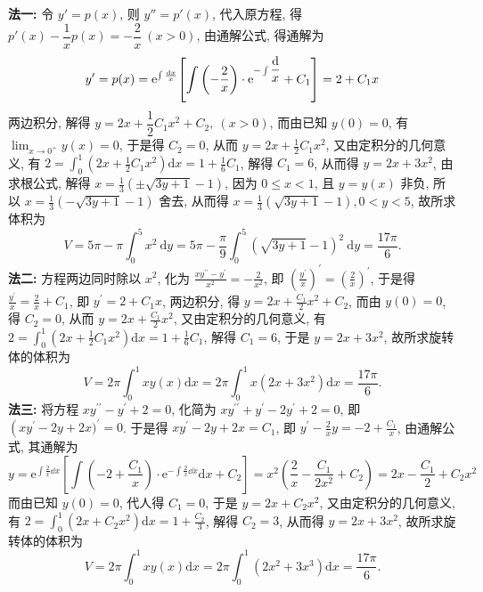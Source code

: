 \begin{solution}
    \textbf{法一: }令 $y'=p(x)$, 则 $y''=p'(x)$, 代入原方程, 得 $p'(x)-\dfrac{1}{x}p(x)=-\dfrac{2}{x}~(x>0)$, 由通解公式, 得通解为 
    $$y'=p(x)=\mathrm{e} ^{\int\frac{\dd x}{x}}\qty[\int\qty(-\dfrac{2}{x})\cdot\mathrm{e} ^{-\int\dfrac{\dd }{x}}+C_1]=2+C_1x$$
    两边积分, 解得 $y=2x+\dfrac{1}{2}C_1x^2+C_2,~(x>0)$, 而由已知 $ y(0)=0 $, 有 $\displaystyle  \lim _{x \rightarrow 0^{+}} y(x)=0 $, 于是得 $ C_{2}=0 $, 从而 $\displaystyle  y=2 x+\frac{1}{2} C_{1} x^{2} $, 又由定积分的几何意义, 有 $\displaystyle  2=\int_{0}^{1}\left(2 x+\frac{1}{2} C_{1} x^{2}\right) \mathrm{d} x=1+\frac{1}{6} C_{1} $, 解得 $ C_{1}=6 $, 从而得 $ y=2 x+3 x^{2} $, 由求根公式, 解得 $\displaystyle  x=\frac{1}{3}( \pm \sqrt{3 y+1}-1) $, 因为 $ 0 \leqslant x<1 $, 且 $ y=y(x) $ 非负, 所以 $\displaystyle  x=\frac{1}{3}(-\sqrt{3 y+1}-1) $ 舍去, 从而得 $\displaystyle  x=\frac{1}{3}(\sqrt{3 y+1}-1), 0<y<5 $, 故所求体积为 $$ V=5 \pi-\pi \int_{0}^{5} x^{2} \mathrm{~d} y=5 \pi-\frac{\pi}{9} \int_{0}^{5}(\sqrt{3 y+1}-1)^{2} \mathrm{~d} y=\frac{17 \pi}{6} .$$
    \textbf{法二: }方程两边同时除以 $ x^{2} $, 化为 $\displaystyle  \frac{x y^{\prime \prime}-y^{\prime}}{x^{2}}=-\frac{2}{x^{2}} $, 即 $\displaystyle  \left(\frac{y^{\prime}}{x}\right)^{\prime}=\left(\frac{2}{x}\right)^{\prime} $, 于是得 $\displaystyle  \frac{y^{\prime}}{x}=\frac{2}{x}+C_{1} $, 即 $ y^{\prime}=2+C_{1} x $, 两边积分, 得 $\displaystyle  y=2 x+\frac{C_{1}}{2} x^{2}+C_{2} $, 而由 $ y(0)=0 $, 得 $ C_{2}=0 $, 从而 $\displaystyle  y=2 x+\frac{C_{1}}{2} x^{2} $, 又由定积分的几何意义, 有 $\displaystyle  2=\int_{0}^{1}\left(2 x+\frac{1}{2} C_{1} x^{2}\right) \mathrm{d} x=1+\frac{1}{6} C_{1} $, 解得 $ C_{1}=6 $, 于是 $ y=2 x+3 x^{2} $, 故所求旋转体的体积为
    $$
    V=2 \pi \int_{0}^{1} x y(x) \mathrm{d} x=2 \pi \int_{0}^{1} x\left(2 x+3 x^{2}\right) \mathrm{d} x=\frac{17 \pi}{6} .
    $$
    \textbf{法三: }将方程 $ x y^{\prime \prime}-y^{\prime}+2=0 $, 化简为 $ x y^{\prime \prime}+y^{\prime}-2 y^{\prime}+2=0 $, 即 $ \left(x y^{\prime}-\right.   2 y+2 x)^{\prime}=0 $. 于是得 $ x y^{\prime}-2 y+2 x=C_{1} $, 即 $\displaystyle  y^{\prime}-\frac{2}{x} y=-2+\frac{C_{1}}{x} $, 由通解公式, 其通解为
    $$y=\mathrm{e}^{\int \frac{2}{x} \dd  x}\left[\int\left(-2+\frac{C_{1}}{x}\right) \cdot \mathrm{e}^{-\int \frac{2}{x} \dd  x} \mathrm{d} x+C_{2}\right]=x^{2}\left(\frac{2}{x}-\frac{C_{1}}{2 x^{2}}+C_{2}\right)=2 x-\frac{C_{1}}{2}+C_{2} x^{2} $$
    而由已知 $ y(0)=0 $, 代人得 $ C_{1}=0 $, 于是 $ y=2 x+C_{2} x^{2} $, 又由定积分的几何意义, 有 $\displaystyle  2=\int_{0}^{1}\left(2 x+C_{2} x^{2}\right) \mathrm{d} x=1+\frac{C_{2}}{3} $, 解得 $ C_{2}=3 $, 从而得 $ y=2 x+3 x^{2} $, 故所求旋转体的体积为
    $$V=2 \pi \int_{0}^{1} x y(x) \mathrm{d} x=2 \pi \int_{0}^{1}\left(2 x^{2}+3 x^{3}\right) \mathrm{d} x=\frac{17 \pi}{6} .$$
\end{solution}

